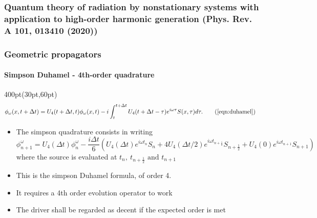 \begin{frame}
\frametitle{Quantum theory of radiation by nonstationary systems 
	with application to high-order harmonic generation
        (Phys. Rev. A 101, 013410 (2020))}
\frametitle{Geometric propagators}
	\framesubtitle{Simpson Duhamel - 4th-order quadrature}
\footnotesize
\begin{textblock*}{400pt}(30pt,60pt)
\begin{align}
	\phi_\omega(x,t+\Delta t) & = U_4(t+\Delta t,t)\phi_\omega(x,t)
	  -i\int_{t}^{t+\Delta t} U_4(t+\Delta t-\tau)e^{i\omega \tau} S(x,\tau)d\tau. \tag{\ref{eqn:duhamel}}
\end{align}
\begin{itemize}
\item The simpson quadrature consists in writing
	\begin{equation}
		\phi^\omega_{n+1} = U_4(\Delta t) \phi^\omega_{n}
		- \frac{i\Delta t}{6}\left(
		  U_4(\Delta t)  e^{i\omega t_{n}}     S_{n}
		+ 4 U_4(\Delta t/2) e^{i\omega t_{n+\frac{1}{2}}} S_{n+\frac{1}{2}}
		+   U_4(0) e^{i\omega t_{n+1}} S_{n+1}
		\right)
		 \label{eqn:simpson_duhamel}
	\end{equation}
		where the source is evaluated at $t_n,\ t_{n+\frac{1}{2}}\mbox{ and } t_{n+1}$
		\vspace{20pt}
\item This is the simpson Duhamel formula, of order 4.
\item It requires a 4th order evolution operator to work
\item The driver shall be regarded as decent if the expected order is met
\end{itemize}

\end{textblock*}

\end{frame}





